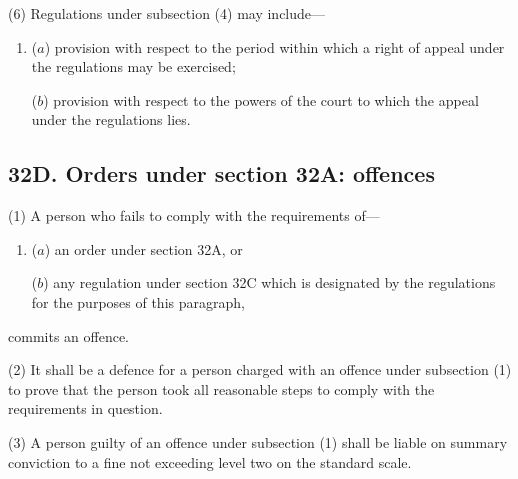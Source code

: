 \documentclass[12pt,a4paper]{article}
\begin{document}
(6)
Regulations under subsection (4) may include---
\begin{enumerate}\item[]
($a$) provision with respect to the period within which a right of appeal under the regulations may be exercised;

($b$) provision with respect to the powers of the court to which the appeal under the regulations lies.
\end{enumerate}


\subsection{32D. Orders under section 32A: offences}

(1) A person who fails to comply with the requirements of---
\begin{enumerate}\item[]
($a$) an order under section 32A, or

($b$) any regulation under section 32C which is designated by the regulations for
the purposes of this paragraph, 
\end{enumerate}
commits an offence.

(2)
It shall be a defence for a person charged with an offence under subsection (1) to prove that the person took all reasonable steps to comply with the requirements in question.

(3)
A person guilty of an offence under subsection (1) shall be liable on summary conviction to a fine not exceeding level two on the standard scale.

\end{document}
